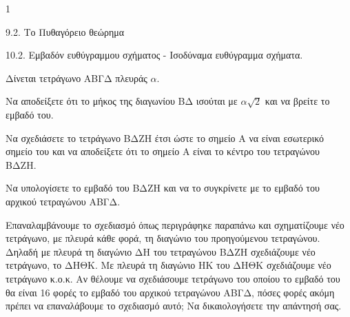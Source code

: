\begin{ylh}{1}
    \item 9.2. Το Πυθαγόρειο θεώρημα
    \item 10.2. Εμβαδόν ευθύγραμμου σχήματος - Ισοδύναμα ευθύγραμμα σχήματα.
\end{ylh}
Δίνεται τετράγωνο ΑΒΓΔ πλευράς $\alpha$.
\begin{alist}
    \item Να αποδείξετε ότι το μήκος της διαγωνίου ΒΔ ισούται με $\alpha\sqrt{2}$ και να βρείτε το εμβαδό του. 
    \item
    \begin{rlist}
        \item Να σχεδιάσετε το τετράγωνο ΒΔΖΗ έτσι ώστε το σημείο Α να είναι εσωτερικό σημείο του και να αποδείξετε ότι το σημείο Α είναι το κέντρο του τετραγώνου ΒΔΖΗ. 
        \item Να υπολογίσετε το εμβαδό του ΒΔΖΗ και να το συγκρίνετε με το εμβαδό του αρχικού τετραγώνου ΑΒΓΔ. 
    \end{rlist}
    \item Επαναλαμβάνουμε το σχεδιασμό όπως περιγράφηκε παραπάνω και σχηματίζουμε νέο τετράγωνο, με πλευρά κάθε φορά, τη διαγώνιο του προηγούμενου τετραγώνου. Δηλαδή με πλευρά τη διαγώνιο ΔΗ του τετραγώνου ΒΔΖΗ σχεδιάζουμε νέο τετράγωνο, το ΔΗΘΚ. Με πλευρά τη διαγώνιο ΗΚ του ΔΗΘΚ σχεδιάζουμε νέο τετράγωνο κ.ο.κ. Αν θέλουμε να σχεδιάσουμε τετράγωνο του οποίου το εμβαδό του θα είναι 16 φορές το εμβαδό του αρχικού τετραγώνου ΑΒΓΔ, πόσες φορές ακόμη πρέπει να επαναλάβουμε το σχεδιασμό αυτό; Να δικαιολογήσετε την απάντησή σας. 
\end{alist}